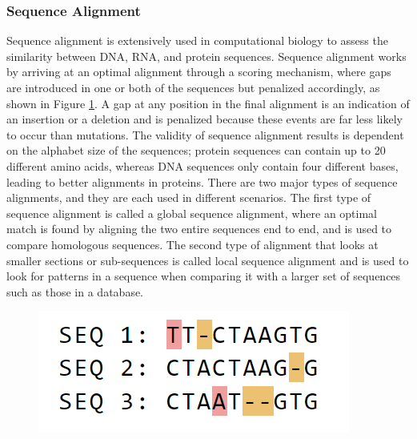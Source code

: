 \subsubsection{Sequence Alignment}
Sequence alignment is extensively used in computational biology to assess the similarity between DNA, RNA, and protein sequences. Sequence alignment works by arriving at an optimal alignment through a scoring mechanism, where gaps are introduced in one or both of the sequences but penalized accordingly, as shown in Figure \ref{fig:ch_2_sequence_alignment_multi}. A gap at any position in the final alignment is an indication of an insertion or a deletion and is penalized because these events are far less likely to occur than mutations. The validity of sequence alignment results is dependent on the alphabet size of the sequences; protein sequences can contain up to 20 different amino acids, whereas DNA sequences only contain four different bases, leading to better alignments in proteins. There are two major types of sequence alignments, and they are each used in different scenarios. The first type of sequence alignment is called a global sequence alignment, where an optimal match is found by aligning the two entire sequences end to end, and is used to compare homologous sequences. The second type of alignment that looks at smaller sections or sub-sequences is called local sequence alignment and is used to look for patterns in a sequence when comparing it with a larger set of sequences such as those in a database. 

\begin{figure}
  \centering
  \includegraphics[width=.45\linewidth]{images/ch_2_sequence_alignment_multi.PNG}
  \label{fig:ch_2_sequence_alignment_multi}
\end{figure}


